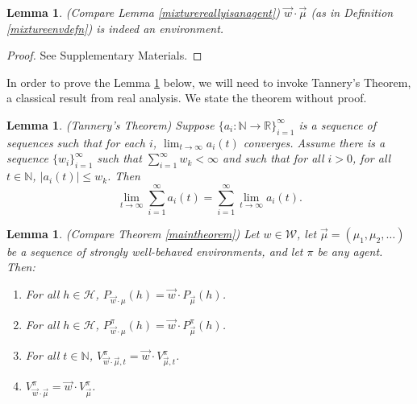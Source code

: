 \documentclass[twoside]{article}
\newtheorem{lemma}[theorem]{Lemma}
\begin{document}
\begin{lemma}
\label{wcdotSisenvlemma}
    (Compare Lemma \ref{mixturereallyisanagent})
    $\vec w\cdot\vec\mu$ (as in Definition \ref{mixtureenvdefn})
    is indeed an environment.
\end{lemma}

\begin{proof}
    See Supplementary Materials.
\end{proof}

In order to prove the Lemma \ref{envmaintheorem} below, we will need to invoke
Tannery's Theorem, a classical result from real analysis. We state the theorem
without proof.

\begin{lemma}
\label{tannerysthm}
    (Tannery's Theorem)
    Suppose $\{a_i:\mathbb N\to\mathbb R\}_{i=1}^\infty$ is a sequence of sequences
    such that for each $i$, $\lim_{t\to\infty}a_i(t)$ converges.
    Assume there is a sequence $\{w_i\}_{i=1}^\infty$
    such that $\sum_{i=1}^\infty w_k<\infty$ and such that for all $i>0$,
    for all $t\in\mathbb N$,
    $|a_i(t)|\leq w_k$. Then
    \[
        \lim_{t\to\infty}\sum_{i=1}^\infty a_i(t)
        =
        \sum_{i=1}^\infty\lim_{t\to\infty} a_i(t).
    \]
\end{lemma}

\begin{lemma}
\label{envmaintheorem}
    (Compare Theorem \ref{maintheorem})
    Let $w\in\mathscr W$, let $\vec\mu=(\mu_1,\mu_2,\ldots)$ be
    a sequence of strongly well-behaved environments, and let $\pi$ be any agent. Then:
    \begin{enumerate}
        \item
        For all $h\in\mathcal H$,
        $P_{\vec w\cdot\mu}(h)=\vec w\cdot P_{\vec\mu}(h)$.
        \item
        For all $h\in\mathcal H$,
        $P^\pi_{\vec w\cdot\mu}(h)=\vec w\cdot P^\pi_{\vec\mu}(h)$.
        \item
        For all $t\in\mathbb N$,
        $V^\pi_{\vec w\cdot \vec\mu,t}=\vec w\cdot V^\pi_{\vec\mu,t}$.
        \item
        $V^\pi_{\vec w\cdot \vec\mu}=\vec w\cdot V^\pi_{\vec\mu}$.
    \end{enumerate}
\end{lemma}
\end{document}
